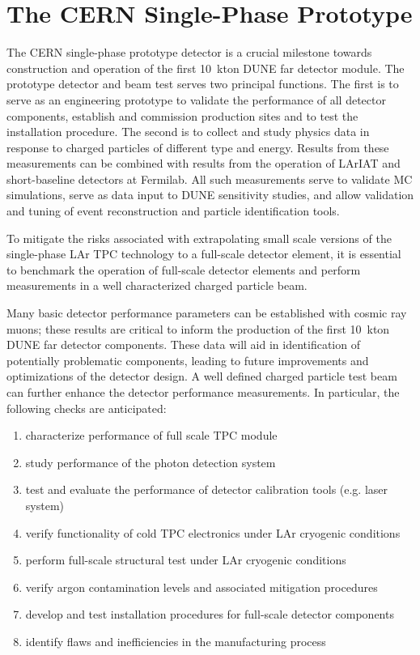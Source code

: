 \section{The CERN Single-Phase Prototype}
\label{sec:proto-cern-single}


The CERN single-phase prototype detector is a crucial milestone towards construction and operation of the
first 10~kton DUNE far detector module. The prototype detector and beam test serves two principal functions.
The first is to serve as an engineering prototype to validate the performance of all detector components,
establish and commission production sites and to test the installation procedure.
The second is to collect and study physics data in response to charged particles of different type and energy.
Results from these measurements can be combined with results from the operation of LArIAT and short-baseline
 detectors at Fermilab.  All such measurements serve to validate MC simulations, serve as data input to DUNE
 sensitivity studies,  and allow validation and tuning of event reconstruction and particle identification tools.

To mitigate the risks associated with extrapolating small scale versions of the single-phase LAr TPC technology
to a full-scale detector element, it is essential to benchmark the operation of full-scale detector elements
and perform measurements in a well characterized charged particle beam.

Many basic detector performance parameters can be established with cosmic ray muons; these results are critical
to inform the production of the first 10~kton DUNE far detector components.  These data will aid in identification of
potentially problematic components, leading to future improvements and optimizations of the detector design.
A well defined charged particle test beam can further enhance the detector performance measurements.
In particular, the following checks are anticipated:
\begin{enumerate}
 \item characterize performance of full scale TPC module
 \item study performance of the photon detection system
 \item test and evaluate the performance of detector calibration tools (e.g. laser system)
  \item verify functionality of cold TPC electronics under LAr cryogenic conditions
  \item perform full-scale structural test under LAr cryogenic conditions
  \item verify argon contamination levels and associated mitigation procedures
  \item develop and test installation procedures for full-scale detector components
  \item identify flaws and inefficiencies in the manufacturing process
\end{enumerate}

